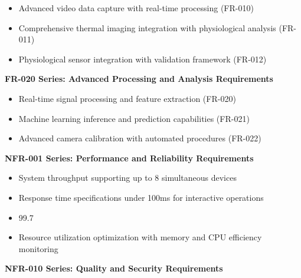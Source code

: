 \documentclass[11pt,a4paper]{report}
\begin{document}
\begin{itemize}
\item Advanced video data capture with real-time processing (FR-010)
\item Comprehensive thermal imaging integration with physiological analysis (FR-011)
\item Physiological sensor integration with validation framework (FR-012)

\end{itemize}
\textbf{FR-020 Series: Advanced Processing and Analysis Requirements}

\begin{itemize}
\item Real-time signal processing and feature extraction (FR-020)
\item Machine learning inference and prediction capabilities (FR-021)
\item Advanced camera calibration with automated procedures (FR-022)

\end{itemize}
\textbf{NFR-001 Series: Performance and Reliability Requirements}

\begin{itemize}
\item System throughput supporting up to 8 simultaneous devices
\item Response time specifications under 100ms for interactive operations
\item 99.7%
\item Resource utilization optimization with memory and CPU efficiency monitoring

\end{itemize}
\textbf{NFR-010 Series: Quality and Security Requirements}
\end{document}
